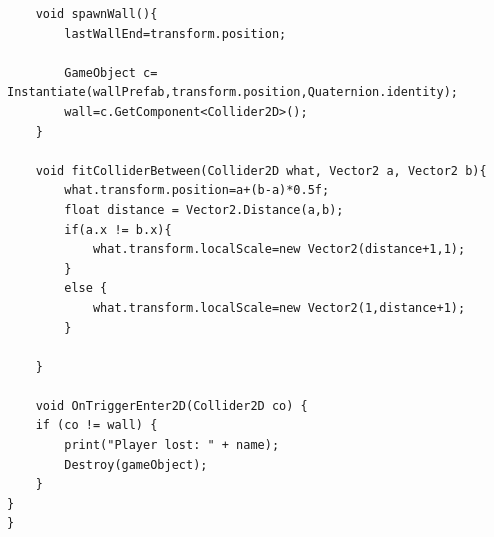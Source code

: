 \documentclass[12pt,a4paper]{article}
\begin{document}
\begin{lstlisting}
	void spawnWall(){
		lastWallEnd=transform.position;
		
		GameObject c= Instantiate(wallPrefab,transform.position,Quaternion.identity);
		wall=c.GetComponent<Collider2D>();
	}
	
	void fitColliderBetween(Collider2D what, Vector2 a, Vector2 b){
		what.transform.position=a+(b-a)*0.5f;
		float distance = Vector2.Distance(a,b);
		if(a.x != b.x){
			what.transform.localScale=new Vector2(distance+1,1);
		}
		else {
			what.transform.localScale=new Vector2(1,distance+1);
		}
		
	}	
	
	void OnTriggerEnter2D(Collider2D co) {
    if (co != wall) {
        print("Player lost: " + name);
        Destroy(gameObject);
    }
}
}

	\end{lstlisting}
\end{document}

